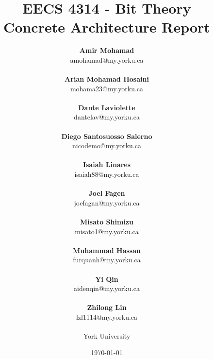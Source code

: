 \documentclass[12pt, dvipsnames, a4paper]{article}
\begin{document}
\title{\textbf{EECS 4314 - Bit Theory\\Concrete Architecture Report}}
\date{\Large \today}
\author{
	\large \textbf{Amir Mohamad}\\ \small amohamad@my.yorku.ca\\\\
	\large \textbf{Arian Mohamad Hosaini}\\ \small mohama23@my.yorku.ca\\\\
	\large \textbf{Dante Laviolette}\\ \small dantelav@my.yorku.ca\\\\
	\large \textbf{Diego Santosuosso Salerno}\\ \small nicodemo@my.yorku.ca\\\\
	\large \textbf{Isaiah Linares}\\ \small isaiah88@my.yorku.ca\\\\
	\large \textbf{Joel Fagen}\\ \small joefagan@my.yorku.ca\\\\
	\large \textbf{Misato Shimizu}\\ \small misato1@my.yorku.ca\\\\
	\large \textbf{Muhammad Hassan}\\ \small furquanh@my.yorku.ca\\\\
	\large \textbf{Yi Qin}\\ \small aidenqin@my.yorku.ca\\\\
	\large \textbf{Zhilong Lin}\\ \small lzl1114@my.yorku.ca\\\\
	\large York University\\
}
\maketitle
\newpage
\hspace{0pt}
\vfill
\end{document}
